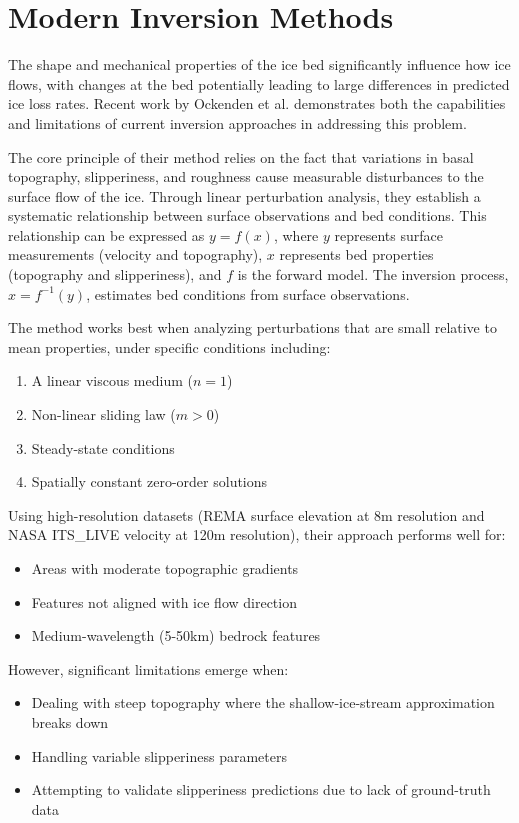 \section{Modern Inversion Methods}\label{Ockenden_2022}

The shape and mechanical properties of the ice bed significantly influence how ice flows, with changes at the bed potentially leading to large differences in predicted ice loss rates\cite{Ockenden_2022}. Recent work by Ockenden et al. demonstrates both the capabilities and limitations of current inversion approaches in addressing this problem.

The core principle of their method relies on the fact that variations in basal topography, slipperiness, and roughness cause measurable disturbances to the surface flow of the ice. Through linear perturbation analysis, they establish a systematic relationship between surface observations and bed conditions. This relationship can be expressed as $y=f(x)$, where $y$ represents surface measurements (velocity and topography), $x$ represents bed properties (topography and slipperiness), and $f$ is the forward model\cite{Gudmundsson_2008}. The inversion process, $x=f^{-1}(y)$, estimates bed conditions from surface observations.

The method works best when analyzing perturbations that are small relative to mean properties, under specific conditions including:
\begin{enumerate}
    \item A linear viscous medium ($n=1$)
    \item Non-linear sliding law ($m>0$)
    \item Steady-state conditions
    \item Spatially constant zero-order solutions
\end{enumerate}

Using high-resolution datasets (REMA surface elevation at 8m resolution and NASA ITS\_LIVE velocity at 120m resolution), their approach performs well for:
\begin{itemize}
    \item Areas with moderate topographic gradients
    \item Features not aligned with ice flow direction
    \item Medium-wavelength (5-50km) bedrock features
\end{itemize}

However, significant limitations emerge when:
\begin{itemize}
    \item Dealing with steep topography where the shallow-ice-stream approximation breaks down
    \item Handling variable slipperiness parameters
    \item Attempting to validate slipperiness predictions due to lack of ground-truth data
\end{itemize}

